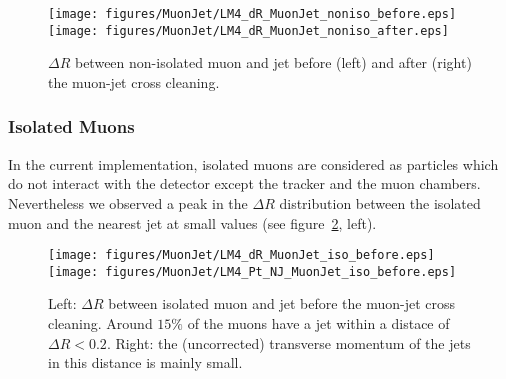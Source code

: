 \documentclass{cmspaper}
\begin{document}
\begin{figure}[hb]
\begin{center}
    \texttt{[image: figures/MuonJet/LM4\_dR\_MuonJet\_noniso\_before.eps]}
    \texttt{[image: figures/MuonJet/LM4\_dR\_MuonJet\_noniso\_after.eps]}
    \caption{\(\Delta R\) between non-isolated muon and jet before (left) and
    after (right) the muon-jet cross cleaning.}
\label{fig:dR_MuonJet_noniso}
\end{center}
\end{figure}

\subsubsection{Isolated Muons}

In the current implementation, isolated muons are considered as particles which do not interact with the detector except the tracker and the muon chambers. Nevertheless we observed a peak in the \(\Delta R\) distribution between the isolated muon and the nearest jet at small values (see figure~\ref{fig:dR_MuonJet_iso}, left).

\begin{figure}[hb]
\begin{center}
    \texttt{[image: figures/MuonJet/LM4\_dR\_MuonJet\_iso\_before.eps]}
    \texttt{[image: figures/MuonJet/LM4\_Pt\_NJ\_MuonJet\_iso\_before.eps]}
    \caption{Left: \(\Delta R\) between isolated muon and jet before the muon-jet cross cleaning. Around \(15\%\) of the muons have a jet within a distace of \(\Delta R < 0.2\). Right: the (uncorrected) transverse momentum of the jets in this distance is mainly small.}
\label{fig:dR_MuonJet_iso}
\end{center}
\end{figure}
\end{document}
